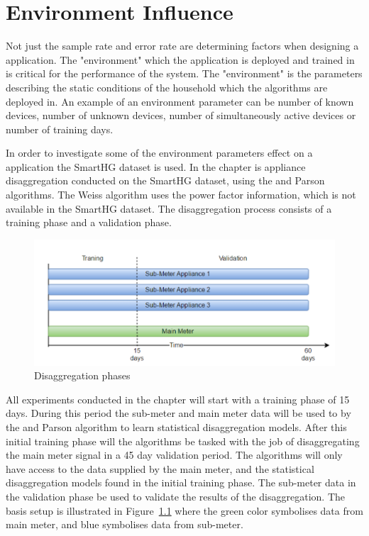 \chapter{Environment Influence } 
\label{sec:EnvInf}
Not just the sample rate and error rate are determining factors when designing a  application. The "environment" which the application is deployed and trained in is critical for the performance of the system. The "environment" is the parameters describing the static conditions of the household which the algorithms are deployed in. An example of an environment parameter can be number of known devices, number of unknown devices, number of simultaneously active devices or number of training days.

In order to investigate some of the environment parameters effect on a  application the SmartHG dataset is used. In the chapter is appliance disaggregation conducted on the SmartHG dataset, using the  and Parson algorithms. The Weiss algorithm uses the power factor information, which is not available in the SmartHG dataset. The disaggregation process consists of a training phase and a validation phase. 

\begin{figure}[H]
\centering
\includegraphics[width=1\textwidth]{billeder/REAL.png}
\caption{Disaggregation phases}
\label{fig:IDF}
\end{figure}

All experiments conducted in the chapter will start with a training phase of 15 days. During this period the sub-meter and main meter data will be used to by the  and Parson algorithm to learn statistical disaggregation models. After this initial training phase will the algorithms be tasked with the job of disaggregating the main meter signal in a 45 day validation period. The algorithms will only have access to the data supplied by the main meter, and the statistical disaggregation models found in the initial training phase. The sub-meter data in the validation phase be used to validate the results of the disaggregation. The basis setup is illustrated in Figure~\ref{fig:IDF} where the green color symbolises data from main meter, and blue symbolises data from sub-meter. 


